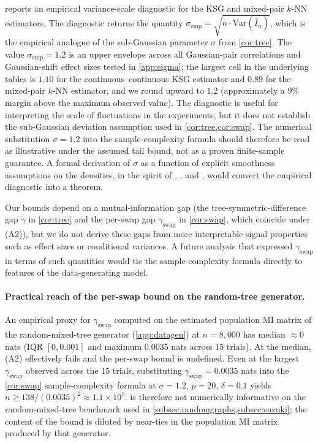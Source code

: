  reports an empirical variance-scale
diagnostic for the KSG and mixed-pair $k$-NN estimators. The
diagnostic returns the quantity
$\sigma_{\mathrm{emp}} = \sqrt{n \cdot \mathrm{Var}(\hat{I}_n)}$,
which is the empirical analogue of the sub-Gaussian parameter
$\sigma$ from \cref{cor:tree}. The value $\sigma_{\mathrm{emp}} = 1.2$ is an upper envelope across
all Gaussian-pair correlations and Gaussian-shift effect sizes
tested in \cref{app:sigma}; the largest cell in the underlying tables is $1.10$ for the
continuous--continuous KSG estimator and $0.89$ for the
mixed-pair $k$-NN estimator, and we round upward to $1.2$
(approximately a $9\%$ margin above the maximum observed value). The diagnostic is
useful for interpreting the scale of fluctuations in the
experiments, but it does not establish the sub-Gaussian deviation
assumption used in \cref{cor:tree,cor:swap}. The numerical substitution $\sigma = 1.2$ into the
sample-complexity formula should therefore be read as
illustrative under the assumed tail bound, not as a proven
finite-sample guarantee. A formal derivation of $\sigma$ as a
function of explicit smoothness assumptions on the densities, in the
spirit of \citet{singh2014exponential}, \citet{berrett2019efficient},
and \citet{han2020optimal}, would convert the empirical diagnostic
into a theorem.

Our bounds depend on a mutual-information gap (the
tree-symmetric-difference gap $\gamma$ in \cref{cor:tree} and the
per-swap gap $\gamma_{\mathrm{swap}}$ in \cref{cor:swap}, which
coincide under (A2)), but we do not derive these gaps from more
interpretable signal properties such as effect sizes or
conditional variances. A future analysis that expressed
$\gamma_{\mathrm{swap}}$ in terms of such quantities would tie the
sample-complexity formula directly to features of the
data-generating model.

\paragraph{Practical reach of the per-swap bound on the random-tree
generator.} An empirical proxy for $\gamma_{\mathrm{swap}}$ computed on the
estimated population MI matrix of the random-mixed-tree generator
(\cref{app:datagen}) at $n = 8{,}000$ has median $\approx 0$ nats
(IQR $[0, 0.001]$ and maximum $0.0035$ nats across 15 trials). At
the median, (A2) effectively fails and the per-swap bound is
undefined. Even at the largest $\gamma_{\mathrm{swap}}$ observed
across the 15 trials, substituting $\gamma_{\mathrm{swap}} = 0.0035$
nats into the \cref{cor:swap} sample-complexity formula at $\sigma
= 1.2$, $p = 20$, $\delta = 0.1$ yields $n \ge 138 / (0.0035)^2
\approx 1.1 \times 10^{7}$.  is therefore not
numerically informative on the random-mixed-tree benchmark used in
\cref{subsec:randomgraphs,subsec:suzuki}; the content of the bound
is diluted by near-ties in the population MI matrix produced by
that generator.

